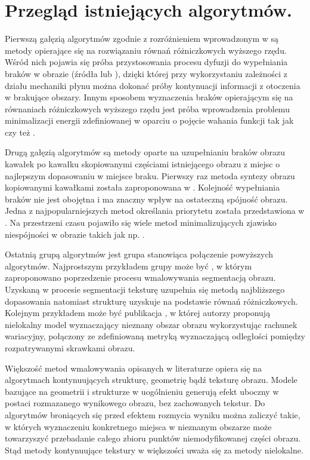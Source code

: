 \documentclass[12pt, twoside, openany]{report}
\theoremstyle{definition}
\begin{document}
\chapter{Przegląd istniejących algorytmów.}
Pierwszą gałęzią algorytmów zgodnie z rozróżnieniem wprowadzonym w  \cite{SalientStrucTexProp} są metody opierające się na rozwiązaniu równań różniczkowych wyższego rzędu. Wśród nich pojawia się próba przystosowania procesu dyfuzji do wypełniania braków w obrazie (źródła \cite{bertalmio2000image} lub \cite{BertalmioNavierStokes}), dzięki której przy wykorzystaniu zależności z działu mechaniki płynu można dokonać próby kontynuacji informacji z otoczenia w brakujące obszary. Innym sposobem wyznaczenia braków opierającym się na równaniach różniczkowych wyższego rzędu jest próba wprowadzenia problemu minimalizacji energii zdefiniowanej w oparciu o pojęcie wahania funkcji tak jak  \cite{MathematicalModelsforNLTextureInpainting} czy też \cite{ColorTextureInpaintingNLCTVModel}.
\par
Drugą gałęzią algorytmów są metody oparte na uzupełnianiu braków obrazu kawałek po kawałku skopiowanymi częściami istniejącego obrazu z miejsc o najlepszym dopasowaniu w miejsce braku. Pierwszy raz metoda syntezy obrazu kopiowanymi kawałkami została zaproponowana w \cite{efros1999texture}. Kolejność wypełniania braków nie jest obojętna i ma znaczny wpływ na ostateczną spójność obrazu. Jedna z najpopularniejszych metod określania priorytetu została przedstawiona w \cite{criminisi2004region}. Na przestrzeni czasu pojawiło się wiele metod minimalizujących zjawisko niespójności w obrazie takich jak np. \cite{StructurePropagationManual}.
\par
Ostatnią grupą algorytmów jest grupa stanowiąca połączenie powyższych algorytmów. Najprostszym przykładem grupy może być \cite{NavierStokesAndTexturePropagation}, w którym zaproponowano poprzedzenie procesu wmalowywania segmentacją obrazu. Uzyskaną w procesie segmentacji teksturę uzupełnia się metodą najbliższego dopasowania natomiast strukturę uzyskuje na podstawie równań różniczkowych. Kolejnym przykładem może być publikacja \cite{arias2011variational}, w której autorzy proponują nielokalny model wyznaczający nieznany obszar obrazu wykorzystując rachunek wariacyjny, połączony ze zdefiniowaną metryką wyznaczającą odległości pomiędzy rozpatrywanymi skrawkami obrazu.
\par
Większość metod wmalowywania opisanych w literaturze opiera się na algorytmach kontynuujących strukturę, geometrię bądź teksturę obrazu. Modele bazujące na geometrii i strukturze w uogólnieniu generują efekt uboczny w postaci rozmazanego wynikowego obrazu, bez zachowanych tekstur.
Do algorytmów broniących się przed efektem rozmycia wyniku można zaliczyć takie, w których wyznaczeniu konkretnego miejsca w nieznanym obszarze może towarzyszyć przebadanie całego zbioru punktów niemodyfikowanej części obrazu. Stąd metody kontynuujące tekstury w większości uważa się za metody nielokalne.
\end{document}
